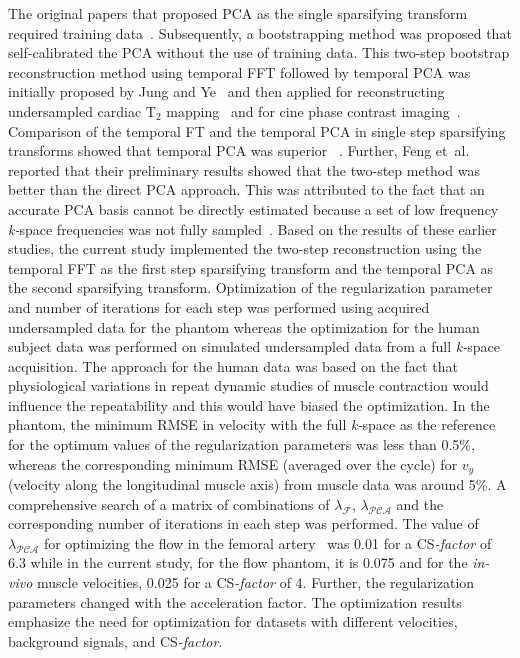 The original papers that proposed PCA as the single sparsifying transform required training data~\cite{RNCS18, RNCS19, RNCS20}. 
Subsequently, a bootstrapping method was proposed that self-calibrated the PCA without the use of training data. 
This two-step bootstrap reconstruction method using temporal FFT followed by temporal PCA was initially proposed by Jung and Ye~\cite{RNCS14} and then applied for reconstructing undersampled cardiac $\mathrm{T_2}$ mapping~\cite{RNCS21} and for cine phase contrast imaging~\cite{RNCS10}. 
Comparison of the temporal FT and the temporal PCA in single step sparsifying transforms showed that temporal PCA was superior ~\cite{RNCS10, RNCS21}. 
Further, Feng et~al.~\cite{RNCS21} reported that their preliminary results showed that the two-step method was better than the direct PCA approach. 
This was attributed to the fact that an accurate PCA basis cannot be directly estimated because a set of low frequency \mbox{\textit{k-}space} frequencies was not fully sampled~\cite{RNCS10, RNCS21}. 
Based on the results of these earlier studies, the current study implemented the two-step reconstruction using the temporal FFT as the first step sparsifying transform and the temporal PCA as the second sparsifying transform. 
Optimization of the regularization parameter and number of iterations for each step was performed using acquired undersampled data for the phantom whereas the optimization for the human subject data was performed on simulated undersampled data from a full \mbox{\textit{k-}space} acquisition. 
The approach for the human data was based on the fact that physiological variations in repeat dynamic studies of muscle contraction would influence the repeatability and this would have biased the optimization. 
In the phantom, the minimum RMSE in velocity with the full \mbox{\textit{k-}space} as the reference for the optimum values of the regularization parameters was less than 0.5\%, whereas the corresponding minimum RMSE (averaged over the cycle) for $v_y$ (velocity along the longitudinal muscle axis) from muscle data was around 5\%. 
A comprehensive search of a matrix of combinations of $\lambda_{\mathcal{F}}$, $\lambda_{\mathcal{PCA}}$ and the corresponding number of iterations in each step was performed. 
The value of $\lambda_{\mathcal{PCA}}$ for optimizing the flow in the femoral artery~\cite{RNCS9, RNCS10} was 0.01 for a \mbox{CS\textit{-factor}} of 6.3 while in the current study, for the flow phantom, it is 0.075 and for the \textit{in-vivo} muscle velocities, 0.025 for a \mbox{CS\textit{-factor}} of 4. 
Further, the regularization parameters changed with the acceleration factor. 
The optimization results emphasize the need for optimization for datasets with different velocities, background signals, and \mbox{CS\textit{-factor}}. 

